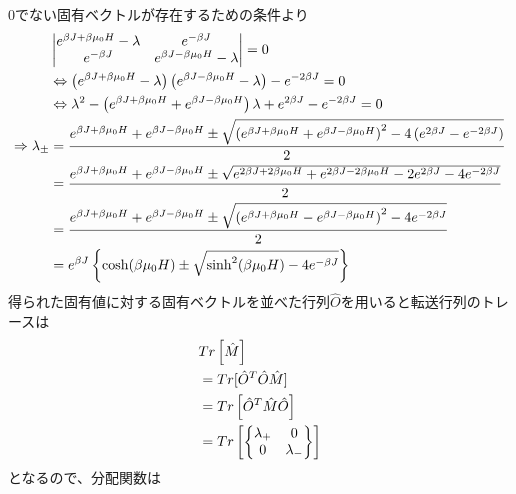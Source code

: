 \documentclass[dvipdfmx, 11pt, a4paper]{jsarticle}
\theoremstyle{definition}
\begin{document}
    0でない固有ベクトルが存在するための条件より
    \begin{align}
        &\left|
        \begin{matrix}
            e^{\beta J + \beta \mu_0 H} - \lambda & e^{-\beta J} \\
            e^{-\beta J}&e^{\beta J - \beta \mu_0 H} - \lambda 
        \end{matrix}
        \right| = 0 \notag \\
        &\Leftrightarrow \left( e^{\beta J + \beta \mu_0 H} - \lambda \right) \left( e^{\beta J - \beta \mu_0 H} - \lambda \right) - e^{-2\beta J} = 0 \notag \\
        &\Leftrightarrow \lambda^2 - \left( e^{\beta J + \beta \mu_0 H} + e^{\beta J - \beta \mu_0 H} \right) \lambda + e^{2\beta J} - e^{-2\beta J} = 0 \notag \\
        \Rightarrow \lambda_{\pm} &= \frac{e^{\beta J + \beta \mu_0 H} + e^{\beta J - \beta \mu_0 H} \pm \sqrt{\left( e^{\beta J + \beta \mu_0 H} + e^{\beta J - \beta \mu_0 H} \right)^2 -4\left( e^{2\beta J} - e^{-2\beta J} \right)}}{2} \notag \\
        &= \frac{e^{\beta J + \beta \mu_0 H} + e^{\beta J - \beta \mu_0 H} \pm \sqrt{ e^{2\beta J + 2\beta \mu_0 H} + e^{2\beta J - 2\beta \mu_0 H}  -2 e^{2\beta J} - 4e^{-2\beta J} }}{2} \notag \\
        &= \frac{e^{\beta J + \beta \mu_0 H} + e^{\beta J - \beta \mu_0 H} \pm \sqrt{ \left( e^{\beta J + \beta \mu_0 H} - e^{\beta J - \beta \mu_0 H} \right)^2 - 4e^{-2\beta J} }}{2} \notag \\
        &= e^{\beta J} \left\{ \cosh(\beta \mu_0 H) \pm \sqrt{\sinh^2(\beta \mu_0 H) - 4e^{-\beta J}} \right\}
    \end{align}
    得られた固有値に対する固有ベクトルを並べた行列$\hat{O}$を用いると転送行列のトレースは
    \begin{align}
        &Tr\left[ \hat{M} \right] \notag \\
        &= Tr[\hat{O}^T \hat{O} \hat{M}] \notag \\
        &= Tr \left[ \hat{O}^T \hat{M} \hat{O} \right] \notag \\
        &= Tr \left[ \left\{
        \begin{matrix}
            \lambda_+ &0\\
            0&\lambda_-
        \end{matrix} 
        \right\} \right]
    \end{align}
    となるので、分配関数は
\end{document}
